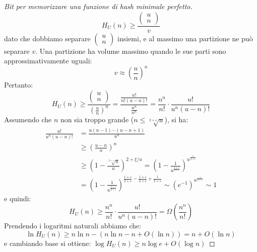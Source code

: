 \documentclass[\main/main.tex]{subfiles}
\begin{document}
\begin{multicols}{2}
\begin{proof}[Bit per memorizzare una funzione di hash minimale perfetto]
    \[
        H_{U}(n) \geq \frac{\left(\begin{array}{l}{u} \\ {n}\end{array}\right)}{v}
    \]
    dato che dobbiamo separare \(\left(\begin{array}{l}{u} \\ {n}\end{array}\right)\) insiemi, e al massimo una partizione ne può separare \(v\). Una partizione ha volume massimo quando le sue parti sono approssimativamente uguali:
    \[
        v \approx\left(\frac{u}{n}\right)^{n}
    \]
    Pertanto:
    \[
        H_{U}(n) \geq \frac{\left(\begin{array}{c}{u} \\ {n}\end{array}\right)}{\left(\frac{u}{n}\right)^{n}}=\frac{\frac{u !}{n !(u-n) !}}{\frac{u^{n}}{n^{n}}}=\frac{n^{n}}{n !} \cdot \frac{u !}{u^{n}(u-n) !}
    \]
    Assumendo che \(n\) non sia troppo grande (\(n \leq \sqrt[2+\varepsilon]{u}\)), si ha:
    \begin{align*}
        \frac{u !}{u^{n}(u-n) !}&=\frac{u(u-1) \cdots(u-n+1)}{u^{n}}\\
        &\geq\left(\frac{u-n}{n}\right)^{n}\\
        &\geq\left(1-\frac{\sqrt[2+\varepsilon]{u}}{u}\right)^{2+\xi / u}=\left(1-\frac{1}{u^{\frac{1+\varepsilon}{2+\varepsilon}}}\right)^{u^{\frac{1}{2+\varepsilon}}}\\
        &=\left(1-\frac{1}{u^{\frac{1+\varepsilon}{2+\varepsilon}}}\right)^{\frac{1+\varepsilon}{2+\varepsilon}-\frac{1+\varepsilon}{2+\varepsilon}+\frac{1}{2+\varepsilon}}\sim\left(e^{-1}\right)^{u^{\frac{-\varepsilon}{2+\varepsilon}}} \sim 1
    \end{align*}
    e quindi:
    \[
        H_{U}(n) \geq \frac{n^{n}}{n !} \cdot \frac{u !}{u^{n}(u-n) !}=\Omega\left(\frac{n^{n}}{n !}\right)
    \]
    Prendendo i logaritmi naturali abbiamo che:
    \[
        \ln H_{U}(n) \geq n \ln n-(n \ln n-n+O(\ln n))=n+O(\ln n)
    \]
    e cambiando base si ottiene: \(
        \log H_{U}(n) \geq n \log e+O(\log n)
    \)
\end{proof}
\end{multicols}
\end{document}
